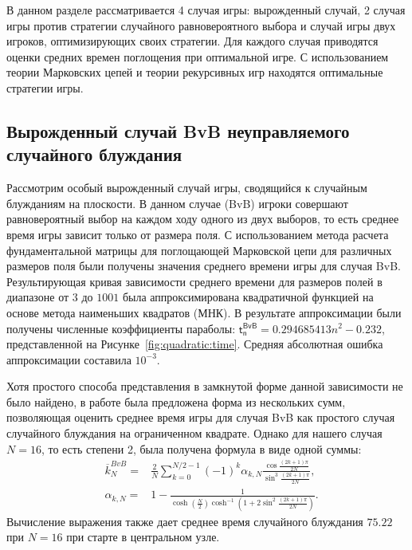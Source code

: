 В данном разделе рассматривается 4 случая игры: вырожденный случай, 2 случая игры против стратегии случайного равновероятного выбора и случай игры двух игроков, оптимизирующих своих стратегии. Для каждого случая приводятся оценки средних времен поглощения при оптимальной игре. С использованием теории Марковских цепей и теории рекурсивных игр находятся оптимальные стратегии игры.

\subsection{Вырожденный случай BvB неуправляемого случайного блуждания}\label{subsec:ch3/sec3/sub1}

Рассмотрим особый вырожденный случай игры, сводящийся к случайным блужданиям на плоскости. В данном случае (BvB) игроки совершают равновероятный выбор на каждом ходу одного из двух выборов, то есть среднее время игры зависит только от размера поля. С использованием метода расчета фундаментальной матрицы для поглощающей Марковской цепи для различных размеров поля были получены значения среднего времени игры для случая BvB. Результирующая кривая зависимости среднего времени для размеров полей в диапазоне от $3$ до $1001$ была аппроксимирована квадратичной функцией на основе метода наименьших квадратов (МНК). В результате аппроксимации были получены численные коэффициенты параболы: $\boldsymbol{\mathsf{t_n^{BvB}}} = 0.294685413 n^2 - 0.232$, представленной на Рисунке~\cref{fig:quadratic:time}. Средняя абсолютная ошибка аппроксимации составила $10^{-3}$. 

Хотя простого способа представления в замкнутой форме данной зависимости  не было найдено, в работе \cite{kmet_gamblers_2002} была предложена форма из нескольких сумм, позволяющая оценить
среднее время игры для случая BvB как простого случая случайного блуждания на ограниченном квадрате. Однако для нашего случая $N=16$, то есть степени 2, была получена формула в виде одной суммы:
\begin{equation}
	\begin{aligned}
		& \overline{k}_N^{BvB} =& \frac{2}{N} \sum_{k=0}^{N/2-1} (-1)^k \alpha_{k,N} 
		\frac{\cos\frac{(2k+1)\pi}{2N}}{\sin^3{\frac{(2k+1)\pi}{2N}}}, \\
		&\alpha_{k,N} =& 1-\frac{1}{\cosh(\frac{N}{2})\cosh^{-1}\left(1+2\sin^2\frac{(2k+1)\pi}{2N}\right)}.
		\label{eq:absorption_bvb_center}
	\end{aligned}
\end{equation}
Вычисление выражения также дает среднее время случайного блуждания $75.22$ при $N=16$ при старте в центральном узле.

